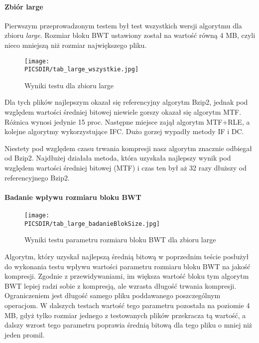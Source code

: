 
\paragraph{Zbiór large}

Pierwszym przeprowadzonym testem był test wszystkich wersji algorytmu dla zbioru {\em large}. Rozmiar bloku BWT ustawiony został na wartość równą 4 MB, czyli nieco mniejszą niż rozmiar największego pliku.

\begin{figure}[phtb]
\texttt{[image: \\PICSDIR/tab\_large\_wszystkie.jpg]}
\caption{\label{fig:tab_large_wszystkie}Wyniki testu dla zbioru large}
\end{figure}

Dla tych plików najlepszym okazał się referencyjny algorytm Bzip2, jednak pod względem wartości średniej bitowej niewiele gorszy okazał się algorytm MTF. Różnica wynosi jedynie 15 proc. Następne miejsce zajął algorytm MTF+RLE, a kolejne algorytmy wykorzystujące IFC. Dużo gorzej wypadły metody IF i DC.
 
Niestety pod względem czasu trwania kompresji nasz algorytm znacznie odbiegał od Bzip2. Najdłużej działała metoda, która uzyskała najlepszy wynik pod względem wartości średniej bitowej (MTF) i czas ten był aż 32 razy dłuższy od referencyjnego Bzip2.

\paragraph{Badanie wpływu rozmiaru bloku BWT}

\begin{figure}[phtb]
\texttt{[image: \\PICSDIR/tab\_large\_badanieBlokSize.jpg]}
\caption{\label{fig:tab_large_badanieBlokSize}Wyniki testu parametru rozmiaru bloku BWT dla zbioru large}
\end{figure}

Algorytm, który uzyskał najlepszą średnią bitową w poprzednim teście posłużył do wykonania testu wpływu wartości parametru rozmiaru bloku BWT na jakość kompresji. Zgodnie z przewidywaniami, im większa wartość bloku tym algorytm BWT lepiej radzi sobie z kompresją, ale wzrasta długość trwania kompresji. Ograniczeniem jest długość samego pliku poddawanego poszczególnym operacjom. W dalszych testach wartość tego parametru pozostała na poziomie 4 MB, gdyż tylko rozmiar jednego z testowanych plików przekracza tą wartość, a dalszy wzrost tego parametru poprawia średnią bitową dla tego pliku o mniej niż jeden promil.

